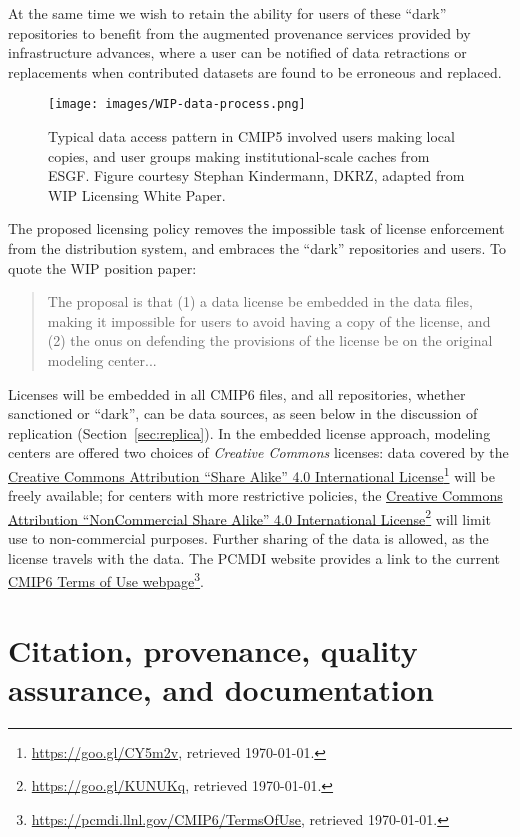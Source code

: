 \documentclass[gmd,manuscript]{copernicus}
\newcommand{\urlref}[2] {\href{#1}{#2}\footnote{\url{#1}, retrieved \today.}}
\begin{document}
At the same time we wish to retain the ability for users of these ``dark''
repositories to benefit from the augmented provenance services provided by
infrastructure advances, where a user can be notified of data retractions or
replacements when contributed datasets are found to be
erroneous and replaced.

\begin{figure*}
  \begin{center}
    \texttt{[image: images/WIP-data-process.png]}
  \end{center}
  \caption{Typical data access pattern in CMIP5 involved users making
    local copies, and user groups making institutional-scale caches
    from ESGF. Figure courtesy Stephan Kindermann, DKRZ, adapted from
    WIP Licensing White Paper.}
  \label{fig:dark}
\end{figure*}

The proposed licensing policy removes the impossible
task of license enforcement from the distribution system, and embraces
the ``dark'' repositories and users. To quote the WIP position paper:

\begin{quote}
  The proposal is that (1) a data license be embedded in the data
  files, making it impossible for users to avoid having a copy of the
  license, and (2) the onus on defending the provisions of the license
  be on the original modeling center...
\end{quote}

Licenses will be embedded in all CMIP6 files, and all repositories, whether
sanctioned or ``dark'', can be data sources, as seen below in the
discussion of replication (Section~\ref{sec:replica}).
In the embedded license approach, modeling centers are offered two
choices of \emph{Creative Commons} licenses: data covered by the
\urlref{https://goo.gl/CY5m2v}{Creative Commons Attribution ``Share
  Alike'' 4.0 International License} will be freely available; for
centers with more restrictive policies, the
\urlref{https://goo.gl/KUNUKq}{Creative Commons Attribution
  ``NonCommercial Share Alike'' 4.0 International License} will limit use 
to non-commercial purposes. Further sharing of the data
is allowed, as the license travels with the data. The PCMDI website
provides a link to the current
\urlref{https://pcmdi.llnl.gov/CMIP6/TermsOfUse}{CMIP6 Terms of Use
  webpage}.

\section{Citation, provenance, quality assurance, and documentation}
\label{sec:cite}
\end{document}
